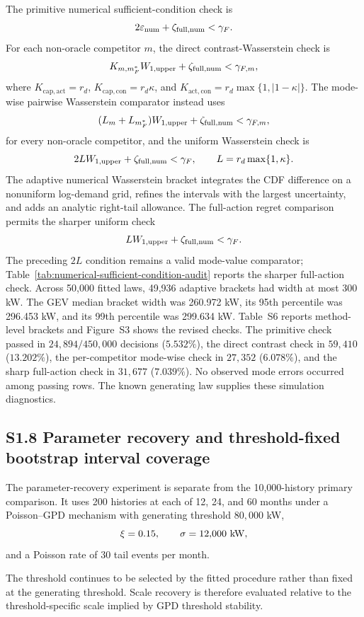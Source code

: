 \documentclass[]{interact}
\begin{document}
The primitive numerical sufficient-condition check is
\[
2\varepsilon_{\rm num}+\zeta_{\rm full,num}<\gamma_F.
\]
For each non-oracle competitor $m$, the direct
contrast-Wasserstein check is
\[
K_{m,m_F^\ast}W_{1,\rm upper}
+\zeta_{\rm full,num}<\gamma_{F,m},
\]
where $K_{\mathrm{cap},\mathrm{act}}=r_d$,
$K_{\mathrm{cap},\mathrm{con}}=r_d\kappa$, and
$K_{\mathrm{act},\mathrm{con}}=r_d\max\{1,|1-\kappa|\}$.
The mode-wise pairwise Wasserstein comparator instead uses
\[
(L_m+L_{m_F^\ast})W_{1,\rm upper}
+\zeta_{\rm full,num}<\gamma_{F,m},
\]
for every non-oracle competitor, and the uniform Wasserstein check is
\[
2L W_{1,\rm upper}+\zeta_{\rm full,num}<\gamma_F,
\qquad L=r_d\max\{1,\kappa\}.
\]
The adaptive numerical Wasserstein bracket integrates the CDF
difference on a nonuniform log-demand grid, refines the intervals with
the largest uncertainty, and adds an analytic right-tail allowance.
The full-action regret comparison permits the sharper uniform check
\[LW_{1,\rm upper}+\zeta_{\rm full,num}<\gamma_F.\]
The preceding $2L$ condition remains a valid mode-value comparator;
Table~\ref{tab:numerical-sufficient-condition-audit} reports the
sharper full-action check. Across 50,000 fitted laws, 49,936 adaptive
brackets had width at most 300 kW. The GEV median bracket width was
260.972 kW, its 95th percentile was 296.453 kW, and its 99th
percentile was 299.634 kW. Table~S6 reports
method-level brackets and Figure~S3 shows the revised checks.
The primitive check passed in $24{,}894/450{,}000$ decisions
($5.532\%$), the direct contrast check in $59{,}410$ ($13.202\%$),
the per-competitor mode-wise check in $27{,}352$ ($6.078\%$), and the
sharp full-action check in $31{,}677$ ($7.039\%$). No observed mode
errors occurred among passing rows. The known generating law supplies
these simulation diagnostics.

\subsection*{S1.8 Parameter recovery and threshold-fixed bootstrap interval coverage}


The parameter-recovery experiment is separate from the 10,000-history
primary comparison. It uses 200 histories at each of 12, 24, and
60 months under a Poisson--GPD mechanism with generating threshold
\(80{,}000\) kW,
\[
\xi=0.15,
\qquad
\sigma=12{,}000\ {\rm kW},
\]
and a Poisson rate of 30 tail events per month.

The threshold continues to be selected by the fitted procedure rather
than fixed at the generating threshold. Scale recovery is therefore
evaluated relative to the threshold-specific scale implied by GPD
threshold stability.
\end{document}
